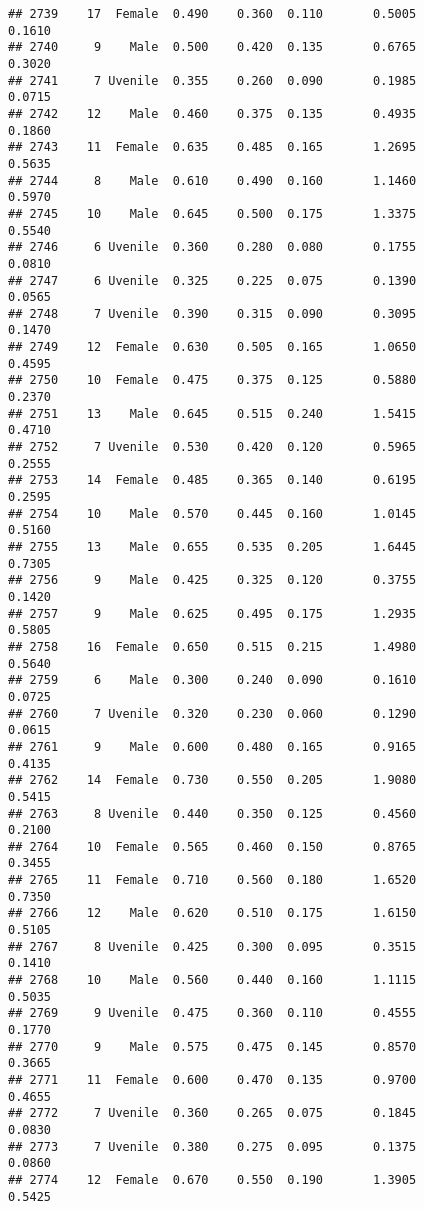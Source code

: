 \documentclass[
]{article}
\begin{document}
\begin{verbatim}
## 2739    17  Female  0.490    0.360  0.110       0.5005         0.1610
## 2740     9    Male  0.500    0.420  0.135       0.6765         0.3020
## 2741     7 Uvenile  0.355    0.260  0.090       0.1985         0.0715
## 2742    12    Male  0.460    0.375  0.135       0.4935         0.1860
## 2743    11  Female  0.635    0.485  0.165       1.2695         0.5635
## 2744     8    Male  0.610    0.490  0.160       1.1460         0.5970
## 2745    10    Male  0.645    0.500  0.175       1.3375         0.5540
## 2746     6 Uvenile  0.360    0.280  0.080       0.1755         0.0810
## 2747     6 Uvenile  0.325    0.225  0.075       0.1390         0.0565
## 2748     7 Uvenile  0.390    0.315  0.090       0.3095         0.1470
## 2749    12  Female  0.630    0.505  0.165       1.0650         0.4595
## 2750    10  Female  0.475    0.375  0.125       0.5880         0.2370
## 2751    13    Male  0.645    0.515  0.240       1.5415         0.4710
## 2752     7 Uvenile  0.530    0.420  0.120       0.5965         0.2555
## 2753    14  Female  0.485    0.365  0.140       0.6195         0.2595
## 2754    10    Male  0.570    0.445  0.160       1.0145         0.5160
## 2755    13    Male  0.655    0.535  0.205       1.6445         0.7305
## 2756     9    Male  0.425    0.325  0.120       0.3755         0.1420
## 2757     9    Male  0.625    0.495  0.175       1.2935         0.5805
## 2758    16  Female  0.650    0.515  0.215       1.4980         0.5640
## 2759     6    Male  0.300    0.240  0.090       0.1610         0.0725
## 2760     7 Uvenile  0.320    0.230  0.060       0.1290         0.0615
## 2761     9    Male  0.600    0.480  0.165       0.9165         0.4135
## 2762    14  Female  0.730    0.550  0.205       1.9080         0.5415
## 2763     8 Uvenile  0.440    0.350  0.125       0.4560         0.2100
## 2764    10  Female  0.565    0.460  0.150       0.8765         0.3455
## 2765    11  Female  0.710    0.560  0.180       1.6520         0.7350
## 2766    12    Male  0.620    0.510  0.175       1.6150         0.5105
## 2767     8 Uvenile  0.425    0.300  0.095       0.3515         0.1410
## 2768    10    Male  0.560    0.440  0.160       1.1115         0.5035
## 2769     9 Uvenile  0.475    0.360  0.110       0.4555         0.1770
## 2770     9    Male  0.575    0.475  0.145       0.8570         0.3665
## 2771    11  Female  0.600    0.470  0.135       0.9700         0.4655
## 2772     7 Uvenile  0.360    0.265  0.075       0.1845         0.0830
## 2773     7 Uvenile  0.380    0.275  0.095       0.1375         0.0860
## 2774    12  Female  0.670    0.550  0.190       1.3905         0.5425

\end{verbatim}
\end{document}
